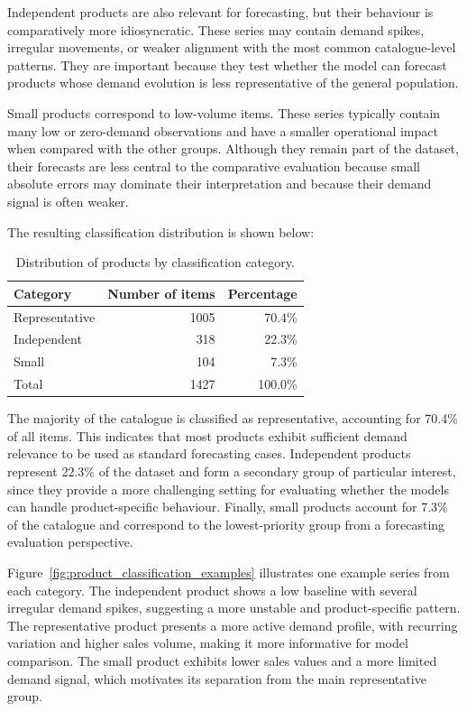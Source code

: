 Independent products are also relevant for forecasting, but their behaviour is comparatively more idiosyncratic. These series may contain demand spikes, irregular movements, or weaker alignment with the most common catalogue-level patterns. They are important because they test whether the model can forecast products whose demand evolution is less representative of the general population.

Small products correspond to low-volume items. These series typically contain many low or zero-demand observations and have a smaller operational impact when compared with the other groups. Although they remain part of the dataset, their forecasts are less central to the comparative evaluation because small absolute errors may dominate their interpretation and because their demand signal is often weaker.

The resulting classification distribution is shown below:

\begin{table}[H]
\centering
\caption{Distribution of products by classification category.}
\label{tab:product_classification_distribution}
\begin{tabular}{lrr}
\hline
\textbf{Category} & \textbf{Number of items} & \textbf{Percentage} \\
\hline
Representative & 1005 & 70.4\% \\
Independent & 318 & 22.3\% \\
Small & 104 & 7.3\% \\
\hline
Total & 1427 & 100.0\% \\
\hline
\end{tabular}
\end{table}

The majority of the catalogue is classified as representative, accounting for 70.4\% of all items. This indicates that most products exhibit sufficient demand relevance to be used as standard forecasting cases. Independent products represent 22.3\% of the dataset and form a secondary group of particular interest, since they provide a more challenging setting for evaluating whether the models can handle product-specific behaviour. Finally, small products account for 7.3\% of the catalogue and correspond to the lowest-priority group from a forecasting evaluation perspective.

Figure~\ref{fig:product_classification_examples} illustrates one example series from each category. The independent product shows a low baseline with several irregular demand spikes, suggesting a more unstable and product-specific pattern. The representative product presents a more active demand profile, with recurring variation and higher sales volume, making it more informative for model comparison. The small product exhibits lower sales values and a more limited demand signal, which motivates its separation from the main representative group.

